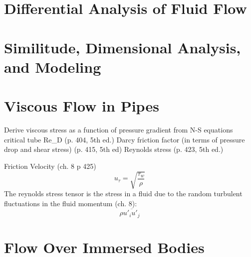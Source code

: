 \documentclass{article}
\begin{document}
%
%
\newpage
\section{Differential Analysis of Fluid Flow}



%
%
\newpage
\section{Similitude, Dimensional Analysis, and Modeling}



%
%
\newpage
\section{Viscous Flow in Pipes}

Derive viscous stress as a function of pressure gradient from N-S equations
critical tube Re_D (p. 404, 5th ed.)
Darcy friction factor (in terms of pressure drop and shear stress) (p. 415, 5th ed)
Reynolds stress (p. 423, 5th ed.)

Friction Velocity (ch. 8 p 425)
\begin{equation}
  u_\tau = \sqrt{\frac{\tau_w}{\rho}}
\end{equation}
\newline
\newline
The reynolds stress tensor is the stress in a fluid due to the random turbulent fluctuations in the fluid momentum (ch. 8):
\begin{equation}
  \rho \overline{u'_i u'_j}
\end{equation}


%
%
\newpage
\section{Flow Over Immersed Bodies}
\end{document}
